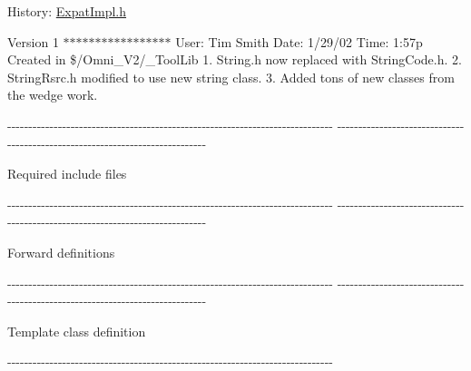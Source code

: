 \begin{DoxyParagraph}{\-History\-:}
\hyperlink{_expat_impl_8h}{\-Expat\-Impl.\-h} 
\end{DoxyParagraph}


\-Version 1 $\ast$$\ast$$\ast$$\ast$$\ast$$\ast$$\ast$$\ast$$\ast$$\ast$$\ast$$\ast$$\ast$$\ast$$\ast$$\ast$$\ast$ \-User\-: \-Tim \-Smith \-Date\-: 1/29/02 \-Time\-: 1\-:57p \-Created in \$/\-Omni\-\_\-\-V2/\-\_\-\-Tool\-Lib 1. \-String.\-h now replaced with \-String\-Code.\-h. 2. \-String\-Rsrc.\-h modified to use new string class. 3. \-Added tons of new classes from the wedge work.

-\/-\/-\/-\/-\/-\/-\/-\/-\/-\/-\/-\/-\/-\/-\/-\/-\/-\/-\/-\/-\/-\/-\/-\/-\/-\/-\/-\/-\/-\/-\/-\/-\/-\/-\/-\/-\/-\/-\/-\/-\/-\/-\/-\/-\/-\/-\/-\/-\/-\/-\/-\/-\/-\/-\/-\/-\/-\/-\/-\/-\/-\/-\/-\/-\/-\/-\/-\/-\/-\/-\/-\/-\/-\/-\/-\/-\/ -\/-\/-\/-\/-\/-\/-\/-\/-\/-\/-\/-\/-\/-\/-\/-\/-\/-\/-\/-\/-\/-\/-\/-\/-\/-\/-\/-\/-\/-\/-\/-\/-\/-\/-\/-\/-\/-\/-\/-\/-\/-\/-\/-\/-\/-\/-\/-\/-\/-\/-\/-\/-\/-\/-\/-\/-\/-\/-\/-\/-\/-\/-\/-\/-\/-\/-\/-\/-\/-\/-\/-\/-\/-\/-\/-\/-\/

\-Required include files

-\/-\/-\/-\/-\/-\/-\/-\/-\/-\/-\/-\/-\/-\/-\/-\/-\/-\/-\/-\/-\/-\/-\/-\/-\/-\/-\/-\/-\/-\/-\/-\/-\/-\/-\/-\/-\/-\/-\/-\/-\/-\/-\/-\/-\/-\/-\/-\/-\/-\/-\/-\/-\/-\/-\/-\/-\/-\/-\/-\/-\/-\/-\/-\/-\/-\/-\/-\/-\/-\/-\/-\/-\/-\/-\/-\/-\/ -\/-\/-\/-\/-\/-\/-\/-\/-\/-\/-\/-\/-\/-\/-\/-\/-\/-\/-\/-\/-\/-\/-\/-\/-\/-\/-\/-\/-\/-\/-\/-\/-\/-\/-\/-\/-\/-\/-\/-\/-\/-\/-\/-\/-\/-\/-\/-\/-\/-\/-\/-\/-\/-\/-\/-\/-\/-\/-\/-\/-\/-\/-\/-\/-\/-\/-\/-\/-\/-\/-\/-\/-\/-\/-\/-\/-\/

\-Forward definitions

-\/-\/-\/-\/-\/-\/-\/-\/-\/-\/-\/-\/-\/-\/-\/-\/-\/-\/-\/-\/-\/-\/-\/-\/-\/-\/-\/-\/-\/-\/-\/-\/-\/-\/-\/-\/-\/-\/-\/-\/-\/-\/-\/-\/-\/-\/-\/-\/-\/-\/-\/-\/-\/-\/-\/-\/-\/-\/-\/-\/-\/-\/-\/-\/-\/-\/-\/-\/-\/-\/-\/-\/-\/-\/-\/-\/-\/ -\/-\/-\/-\/-\/-\/-\/-\/-\/-\/-\/-\/-\/-\/-\/-\/-\/-\/-\/-\/-\/-\/-\/-\/-\/-\/-\/-\/-\/-\/-\/-\/-\/-\/-\/-\/-\/-\/-\/-\/-\/-\/-\/-\/-\/-\/-\/-\/-\/-\/-\/-\/-\/-\/-\/-\/-\/-\/-\/-\/-\/-\/-\/-\/-\/-\/-\/-\/-\/-\/-\/-\/-\/-\/-\/-\/-\/

\-Template class definition

-\/-\/-\/-\/-\/-\/-\/-\/-\/-\/-\/-\/-\/-\/-\/-\/-\/-\/-\/-\/-\/-\/-\/-\/-\/-\/-\/-\/-\/-\/-\/-\/-\/-\/-\/-\/-\/-\/-\/-\/-\/-\/-\/-\/-\/-\/-\/-\/-\/-\/-\/-\/-\/-\/-\/-\/-\/-\/-\/-\/-\/-\/-\/-\/-\/-\/-\/-\/-\/-\/-\/-\/-\/-\/-\/-\/-\/ 


